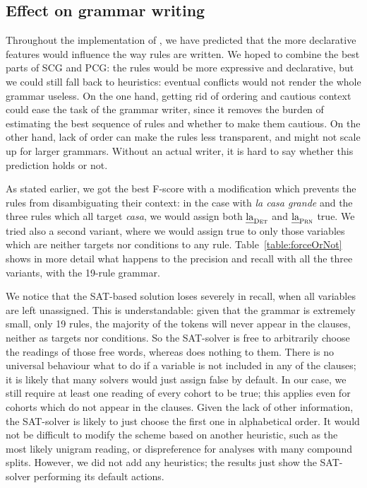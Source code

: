 \subsection{Effect on grammar writing}


Throughout the implementation of \satcg{}, we have predicted that the more declarative features would influence the way rules are written. 
We hoped to combine the best parts of SCG and PCG: 
the rules would be more expressive and declarative, 
but we could still fall back to heuristics: eventual 
conflicts would not render the whole grammar useless.
On the one hand, getting rid of ordering and cautious context could ease the task of the grammar writer, since it removes the burden of estimating the best sequence of rules and whether to make them cautious. On the other hand, lack of order can make the rules less transparent, and might not scale up for larger grammars.
Without an actual \onlycg{} writer, it is hard to say whether this prediction holds or not.

As stated earlier, we got the best F-score with a modification which prevents the rules 
from disambiguating their context: in the case with {\em la casa grande} and the 
three rules which all target {\em casa}, we would assign both $\text{\em la}_{\text{\sc Det}}${} and $\text{\em la}_{\text{\sc Prn}}${} true.
We tried also a second variant, where we would assign true to only those variables which are 
neither targets nor conditions to any rule.
Table~\ref{table:forceOrNot} shows in more detail what happens to the precision and recall with all the three variants, with the 19-rule grammar.



We notice that the SAT-based solution loses severely in recall, 
when all variables are left unassigned. This is understandable: given that
the grammar is extremely small, only 19 rules, the majority of the tokens will 
never appear in the clauses, neither as targets nor conditions. So the SAT-solver is free to 
arbitrarily choose the readings of those free words, whereas  does nothing to them. 
There is no universal behaviour what to do if a variable is not included in any of the clauses; it is likely that many solvers would just assign false by default. In our case, we still require at least one reading of every cohort to be true; this applies even for cohorts which do not appear in the clauses. 
Given the lack of other information, the SAT-solver is likely to just choose the first one in alphabetical order. It would not be difficult to modify the scheme based on another heuristic, such as the most likely unigram reading, or dispreference for analyses with many compound splits. However, we did not add any heuristics; the results just show the SAT-solver performing its default actions.

